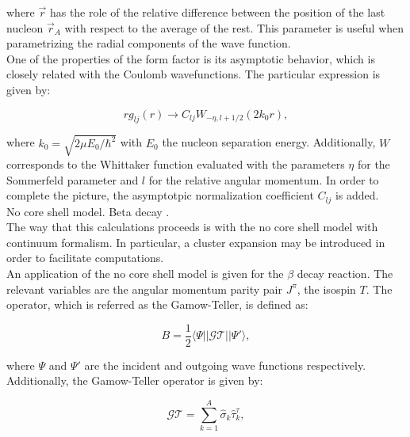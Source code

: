 \documentclass[openany]{book}
\begin{document}
where $\vec r$ has the role of the relative difference between the position of the last nucleon $\vec r_A$ with respect to the average of the rest. This parameter is useful when parametrizing the radial components of the wave function. \\

One of the properties of the form factor is its asymptotic behavior, which is closely related with the Coulomb wavefunctions. The particular expression is given by: 

\begin{equation}\label{eq:micro_NCSH_application_asymptotics}
	r g_{lj}(r) \rightarrow C_{lj} W_{-\eta , l + 1/2} (2k_0r), 
\end{equation}

where $k_0 = \sqrt{2\mu E_0/\hbar^2}$ with $E_0$ the nucleon separation energy. Additionally, $W$ corresponds to the Whittaker function evaluated with the parameters $\eta$ for the Sommerfeld parameter and $l$ for the relative angular momentum. In order to complete the picture, the asymptotpic normalization coefficient $C_{lj}$ is added.  \\

No core shell model. Beta decay \cite{atkinson_navratil_hupin_kravvaris_quaglioni_2022}. \\

The way that this calculations proceeds is with the no core shell model with continuum formalism. In particular, a cluster expansion may be introduced in order to facilitate computations. \\

An application of the no core shell model is given for the $\beta$ decay reaction. The relevant variables are the angular momentum parity pair $J^\pi$, the isospin $T$. The operator, which is referred as the Gamow-Teller, is defined as: 

\begin{equation}\label{eq:micro_NCSM_beta_asymptotics}
	B = \frac{1}{2} \langle \Psi || \mathcal{GT} || \Psi ' \rangle, 
\end{equation}

where $\Psi$ and $\Psi'$ are the incident and outgoing wave functions respectively. Additionally, the Gamow-Teller operator is given by: 

 \begin{equation}\label{eq:micro_NCSM_beta_GToperator}
 	\mathcal{GT} = \sum_{k = 1}^{A} \hat \sigma_k \hat \tau_k^{\tau},
 \end{equation}
\end{document}
